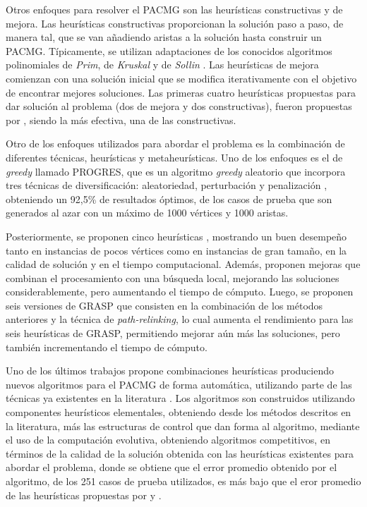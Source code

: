 Otros enfoques para resolver el PACMG son las heurísticas constructivas y de mejora. Las heurísticas constructivas proporcionan la solución paso a paso, de manera tal, que se van añadiendo aristas a la solución hasta construir un PACMG. Típicamente, se utilizan adaptaciones de los conocidos algoritmos polinomiales de \textit{Prim}, de \textit{Kruskal} y de \textit{Sollin} \citep{papadimitriou1982combinatorial}. Las heurísticas de mejora comienzan con una solución inicial que se modifica iterativamente con el objetivo de encontrar mejores soluciones. Las primeras cuatro heurísticas propuestas para dar solución al problema (dos de mejora y dos constructivas), fueron propuestas por \cite{dror2000generalized}, siendo la más efectiva, una de las constructivas.

Otro de los enfoques utilizados para abordar el problema es la combinación de diferentes técnicas, heurísticas y metaheurísticas. Uno de los enfoques es el de \textit{greedy} llamado PROGRES, que es un algoritmo \textit{greedy} aleatorio que incorpora tres técnicas de diversificación: aleatoriedad, perturbación y penalización \citep{haouari2006upper}, obteniendo un 92,5\% de resultados óptimos, de los casos de prueba que son generados al azar con un máximo de 1000 vértices y 1000 aristas.

Posteriormente, se proponen cinco heurísticas \citep{ferreira2012grasp}, mostrando un buen desempeño tanto en instancias de pocos vértices como en instancias de gran tamaño, en la calidad de solución y en el tiempo computacional. Además, proponen mejoras que combinan el procesamiento con una búsqueda local, mejorando las soluciones considerablemente, pero aumentando el tiempo de cómputo. Luego, se proponen seis versiones de GRASP \citep{talbi2009metaheuristics} que consisten en la combinación de los métodos anteriores y la técnica de \textit{path-relinking}, lo cual aumenta el rendimiento para las seis heurísticas de GRASP, permitiendo mejorar aún más las soluciones, pero también incrementando el tiempo de cómputo.

Uno de los últimos trabajos propone combinaciones heurísticas produciendo nuevos algoritmos para el PACMG de forma automática, utilizando parte de las técnicas ya existentes en la literatura \citep{contreras2016multi}. Los algoritmos son construidos utilizando componentes heurísticos elementales, obteniendo desde los métodos descritos en la literatura, más las estructuras de control que dan forma al algoritmo, mediante el uso de la computación evolutiva, obteniendo algoritmos competitivos, en términos de la calidad de la solución obtenida con las heurísticas existentes para abordar el problema, donde se obtiene que el error promedio obtenido por el algoritmo, de los 251 casos de prueba utilizados, es más bajo que el eror promedio de las heurísticas propuestas por \cite{golden2005heuristic} y \cite{ferreira2012grasp}.


